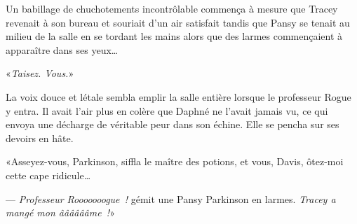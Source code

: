 Un babillage de chuchotements incontrôlable commença à mesure que Tracey revenait à son bureau et souriait d'un air satisfait tandis que Pansy se tenait au milieu de la salle en se tordant les mains alors que des larmes commençaient à apparaître dans ses yeux…

«\emph{Taisez. Vous.}»

La voix douce et létale sembla emplir la salle entière lorsque le professeur Rogue y entra. Il avait l'air plus en colère que Daphné ne l'avait jamais vu, ce qui envoya une décharge de véritable peur dans son échine. Elle se pencha sur ses devoirs en hâte.

«Asseyez-vous, Parkinson, siffla le maître des potions, et vous, Davis, ôtez-moi cette cape ridicule…

--- \emph{Professeur Rooooooogue~!} gémit une Pansy Parkinson en larmes. \emph{Tracey a mangé mon ââââââme~!}»
